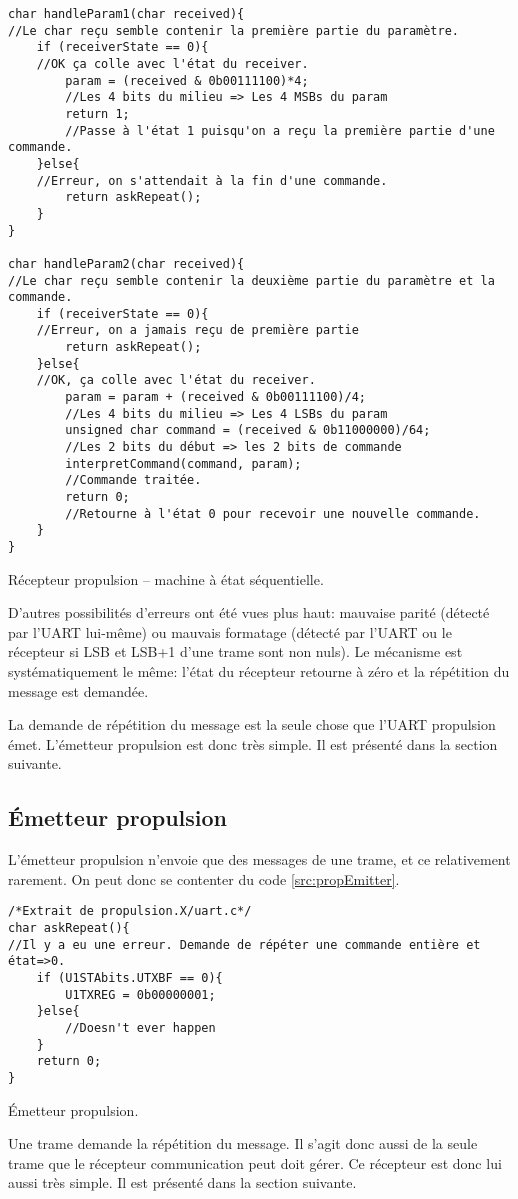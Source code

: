 \begin{listing}[htbp]
\begin{verbatim}
char handleParam1(char received){
//Le char reçu semble contenir la première partie du paramètre.
    if (receiverState == 0){
    //OK ça colle avec l'état du receiver.
        param = (received & 0b00111100)*4;
        //Les 4 bits du milieu => Les 4 MSBs du param
        return 1;
        //Passe à l'état 1 puisqu'on a reçu la première partie d'une commande.
    }else{
    //Erreur, on s'attendait à la fin d'une commande.
        return askRepeat();
    }
}

char handleParam2(char received){
//Le char reçu semble contenir la deuxième partie du paramètre et la commande.
    if (receiverState == 0){
    //Erreur, on a jamais reçu de première partie
        return askRepeat();
    }else{
    //OK, ça colle avec l'état du receiver.
        param = param + (received & 0b00111100)/4;
        //Les 4 bits du milieu => Les 4 LSBs du param
        unsigned char command = (received & 0b11000000)/64;
        //Les 2 bits du début => les 2 bits de commande
        interpretCommand(command, param);
        //Commande traitée.
        return 0;
        //Retourne à l'état 0 pour recevoir une nouvelle commande.
    }
}
\end{verbatim}
\caption{Récepteur propulsion -- machine à état séquentielle.\label{src:propReceptor}}
\end{listing}
D'autres possibilités d'erreurs ont été vues plus haut: mauvaise parité (détecté par l'UART lui-même) ou mauvais formatage (détecté par l'UART ou le récepteur si LSB et LSB+1 d'une trame sont non nuls). Le mécanisme est systématiquement le même: l'état du récepteur retourne à zéro et la répétition du message est demandée.

La demande de répétition du message est la seule chose que l'UART propulsion émet. L'émetteur propulsion est donc très simple. Il est présenté dans la section suivante.

\subsection{\'Emetteur propulsion}
L'émetteur propulsion n'envoie que des messages de une trame, et ce relativement rarement. On peut donc se contenter du code \ref{src:propEmitter}.
\begin{listing}[htbp]
\begin{verbatim}
/*Extrait de propulsion.X/uart.c*/
char askRepeat(){
//Il y a eu une erreur. Demande de répéter une commande entière et état=>0.
    if (U1STAbits.UTXBF == 0){
        U1TXREG = 0b00000001;
    }else{
        //Doesn't ever happen
    }
    return 0;
}
\end{verbatim}
\caption{\'Emetteur propulsion.\label{src:propEmitter}}
\end{listing}
Une trame  demande la répétition du message. Il s'agit donc aussi de la seule trame que le récepteur communication peut doit gérer. Ce récepteur est donc lui aussi très simple. Il est présenté dans la section suivante.


